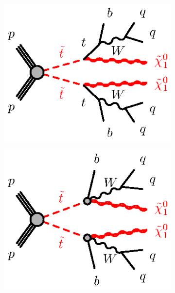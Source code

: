 \begin{figure}[h!]
  \begin{center}
  \begin{subfigure}[b]{0.35\textwidth}  
    \includegraphics[width=\textwidth]{figures/feynDiag/stst-bqqbqqN1N1-tt.eps}
               \caption{ }
    \end{subfigure}
      \begin{subfigure}[b]{0.35\textwidth}      
    \includegraphics[width=\textwidth]{figures/feynDiag/stst-bqqbqqN1N1-3body.eps}
               \caption{ }

\end{subfigure}
\end{center}
\end{figure}
